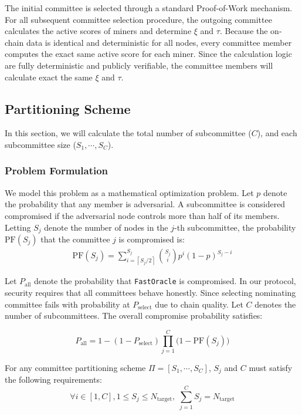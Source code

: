 \documentclass[journal]{IEEEtran}
\newcommand{\code}[1]{\texttt{#1}}
\begin{document}
The initial committee is selected through a standard Proof-of-Work mechanism. For all subsequent committee selection procedure, the outgoing committee calculates the active scores of miners and determine $\xi$ and $\tau$. Because the on-chain data is identical and deterministic for all nodes, every committee member computes the exact same active score for each miner. Since the calculation logic are fully deterministic and publicly verifiable, the committee members will calculate exact the same $\xi$ and $\tau$.

\subsection{Partitioning Scheme}
\label{sec:calculate-committee-size}
In this section, we will calculate the total number of subcommittee ($C$), and each subcommittee size ($S_1,\cdots,S_C$).

\subsubsection{Problem Formulation}
We model this problem as a mathematical optimization problem. Let \(p\) denote the probability that any member is adversarial. A subcommittee is considered compromised if the adversarial node controls more than half of its members. Letting $S_j$ denote the number of nodes in the $j$-th subcommittee, the probability $\text{PF}(S_j)$ that the committee $j$ is compromised is:
\begin{align}
\text{PF}(S_j) = \sum_{i= \left\lceil S_j/2 \right\rceil}^{S_j} \binom{S_j}{i} p^{i} (1-p)^{S_j-i}
\end{align}

Let $P_{\text{all}}$ denote the probability that \code{FastOracle} is compromised. In our protocol, security requires that all committees behave honestly. Since selecting nominating committee fails with probability at $P_{\text{select}}$ due to chain quality. Let $C$ denotes the number of subcommittees. The overall compromise probability satisfies:

\begin{equation}
P_{\text{all}}=1-(1-P_{\text{select}})\prod_{j=1}^{C}\Big(1-\text{PF}(S_j)\Big)
\end{equation}

For any committee partitioning scheme $\Pi=[S_1,\cdots,S_C]$, $S_j$ and $C$ must satisfy the following requirements:
\begin{equation}
    \forall i \in \left[1,C \right], 1 \leq S_j \le N_{\text{target}},\;\sum_{j=1}^C S_j=N_{\text{target}}
\end{equation}
\end{document}
